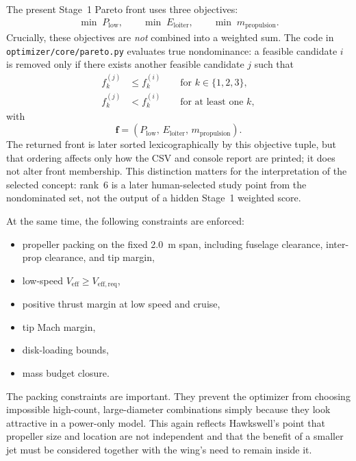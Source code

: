 \documentclass[conf]{new-aiaa}
\begin{document}
The present Stage~1 Pareto front uses three objectives:
\begin{align}
\min \; P_{\mathrm{low}}, \qquad
\min \; E_{\mathrm{loiter}}, \qquad
\min \; m_{\mathrm{propulsion}}.
\end{align}
Crucially, these objectives are \emph{not} combined into a weighted sum. The code in \texttt{optimizer/core/pareto.py} evaluates true nondominance: a feasible candidate \(i\) is removed only if there exists another feasible candidate \(j\) such that
\begin{align}
f_k^{(j)} &\le f_k^{(i)} \qquad \text{for } k\in\{1,2,3\}, \\
f_k^{(j)} &< f_k^{(i)} \qquad \text{for at least one } k,
\end{align}
with
\begin{equation}
\mathbf{f} =
\left(P_{\mathrm{low}},\, E_{\mathrm{loiter}},\, m_{\mathrm{propulsion}}\right).
\end{equation}
The returned front is later sorted lexicographically by this objective tuple, but that ordering affects only how the CSV and console report are printed; it does not alter front membership. This distinction matters for the interpretation of the selected concept: rank~6 is a later human-selected study point from the nondominated set, not the output of a hidden Stage~1 weighted score.

At the same time, the following constraints are enforced:
\begin{itemize}
\item propeller packing on the fixed \SI{2.0}{m} span, including fuselage clearance, inter-prop clearance, and tip margin,
\item low-speed \(V_{\mathrm{eff}} \ge V_{\mathrm{eff,req}}\),
\item positive thrust margin at low speed and cruise,
\item tip Mach margin,
\item disk-loading bounds,
\item mass budget closure.
\end{itemize}

The packing constraints are important. They prevent the optimizer from choosing impossible high-count, large-diameter combinations simply because they look attractive in a power-only model. This again reflects Hawkswell's point that propeller size and location are not independent and that the benefit of a smaller jet must be considered together with the wing's need to remain inside it.\cite{Hawkswell2022}
\end{document}
